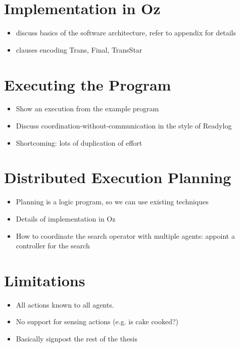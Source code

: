 \section{Implementation in Oz}
\begin{itemize}
\item discuss basics of the software architecture, refer to appendix for details
\item clauses encoding Trans, Final, TransStar
\end{itemize}

\section{Executing the Program}
\begin{itemize}
\item Show an execution from the example program
\item Discuss coordination-without-communication in the style of Readylog
\item Shortcoming: lots of duplication of effort
\end{itemize}

\section{Distributed Execution Planning}
\begin{itemize}
\item Planning is a logic program, so we can use existing techniques
\item Details of implementation in Oz
\item How to coordinate the search operator with multiple agents: appoint a controller for the search
\end{itemize}

\section{Limitations}
\begin{itemize}
\item All actions known to all agents. 
\item No support for sensing actions (e.g. is cake cooked?)
\item Basically signpost the rest of the thesis
\end{itemize}

